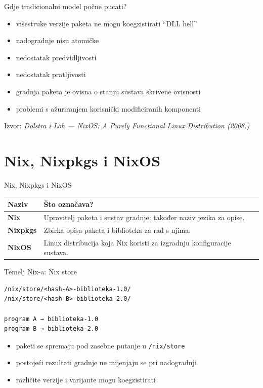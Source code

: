 \documentclass{beamer}
\begin{document}
\begin{frame}{Gdje tradicionalni model počne pucati?}
	\begin{itemize}
		\item višestruke verzije paketa ne mogu koegzistirati \textrightarrow{} \enquote{DLL hell}
		\item nadogradnje nisu atomičke
		\item nedostatak predvidljivosti
		\item nedostatak pratljivosti
		\item gradnja paketa je ovisna o stanju sustava \textrightarrow{} skrivene ovisnosti
		\item problemi s ažuriranjem korisnički modificiranih komponenti
	\end{itemize}

	\vfill
	{\scriptsize Izvor: \emph{Dolstra i Löh --- NixOS: A Purely Functional Linux Distribution (2008.)} \cite{nixos-paper}}
\end{frame}

\section{Nix, Nixpkgs i NixOS}

\begin{frame}{Nix, Nixpkgs i NixOS}
	\vskip25pt
	\centering
	{\renewcommand{\arraystretch}{1.3}
		\begin{tabular}{@{}l >{\raggedright\arraybackslash}p{8.0cm}@{}}
			\toprule
			\textbf{Naziv}   & \textbf{Što označava?}                                                  \\
			\midrule
			\textbf{Nix}     & Upravitelj paketa i sustav gradnje; također naziv jezika za opise.      \\
			\textbf{Nixpkgs} & Zbirka opisa paketa i biblioteka za rad s njima.                        \\
			\textbf{NixOS}   & Linux distribucija koja Nix koristi za izgradnju konfiguracije sustava. \\
			\bottomrule
		\end{tabular}}
\end{frame}

\begin{frame}[fragile]{Temelj Nix-a: Nix store}
	\begin{lstlisting}
/nix/store/<hash-A>-biblioteka-1.0/
/nix/store/<hash-B>-biblioteka-2.0/

program A → biblioteka-1.0
program B → biblioteka-2.0
\end{lstlisting}
	\begin{itemize}
		\item paketi se spremaju pod zasebne putanje u \texttt{/nix/store}
		\item postojeći rezultati gradnje ne mijenjaju se pri nadogradnji
		\item različite verzije i varijante mogu koegzistirati
	\end{itemize}
\end{frame}
\end{document}
